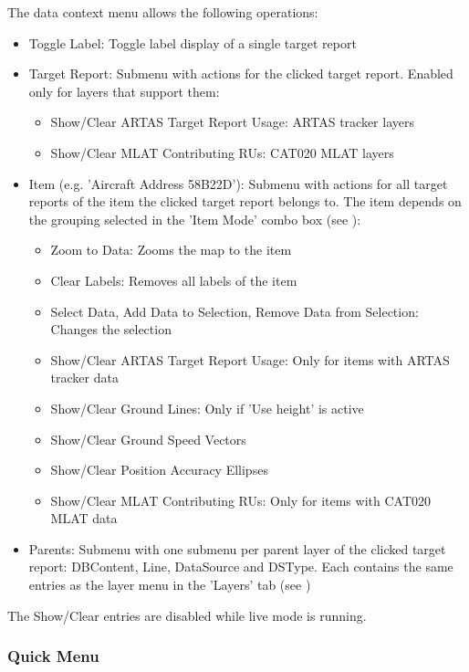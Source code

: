 The data context menu allows the following operations:

\begin{itemize}
 \item Toggle Label: Toggle label display of a single target report
 \item Target Report: Submenu with actions for the clicked target report. Enabled only for layers that support them:
    \begin{itemize}
     \item Show/Clear ARTAS Target Report Usage: ARTAS tracker layers
     \item Show/Clear MLAT Contributing RUs: CAT020 MLAT layers
    \end{itemize}
 \item Item (e.g. 'Aircraft Address 58B22D'): Submenu with actions for all target reports of the item the clicked target report belongs to. The item depends on the grouping selected in the 'Item Mode' combo box (see ):
    \begin{itemize}
     \item Zoom to Data: Zooms the map to the item
     \item Clear Labels: Removes all labels of the item
     \item Select Data, Add Data to Selection, Remove Data from Selection: Changes the selection
     \item Show/Clear ARTAS Target Report Usage: Only for items with ARTAS tracker data
     \item Show/Clear Ground Lines: Only if 'Use height' is active
     \item Show/Clear Ground Speed Vectors
     \item Show/Clear Position Accuracy Ellipses
     \item Show/Clear MLAT Contributing RUs: Only for items with CAT020 MLAT data
    \end{itemize}
 \item Parents: Submenu with one submenu per parent layer of the clicked target report: DBContent, Line, DataSource and DSType. Each contains the same entries as the layer menu in the 'Layers' tab (see )
\end{itemize}

The Show/Clear entries are disabled while live mode is running.


\subsubsection{Quick Menu}


